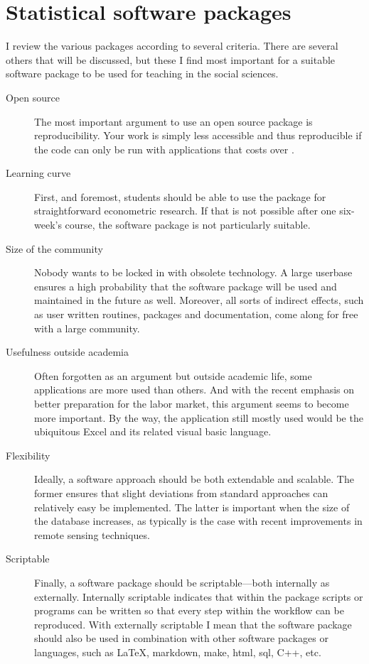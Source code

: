 \documentclass[fleqn,10pt]{SelfArx} %
\begin{document}
\section*{Statistical software packages}

I review the various packages according to several criteria. There are several
others that will be discussed, but these I find most important for a suitable
software package to be used for teaching in the social sciences. 
\begin{description}
\item[Open source] The most important argument to use an open source package is
  reproducibility. Your work is simply less accessible and thus reproducible if
  the code can only be run with applications that costs over . 
\item[Learning curve] First, and foremost, students should be able to use the
  package for straightforward econometric research. If that is not possible
  after one six-week's course, the software package is not particularly
  suitable. 
\item[Size of the community] Nobody wants to be locked in with obsolete
  technology. A large userbase ensures a high probability that the software
  package will be used and maintained in the future as well. Moreover, all sorts
  of indirect effects, such as user written routines, packages and
  documentation, come along for free with a large community. 
\item[Usefulness outside academia] Often forgotten as an argument but outside
  academic life, some applications are more used than others. And with the
  recent emphasis on better preparation for the labor market, this argument
  seems to become more important. By the way, the
  application still mostly used would be the ubiquitous Excel and its related
  visual basic language.
\item[Flexibility] Ideally, a software approach should be both extendable and scalable. The former ensures that slight deviations from standard approaches can relatively easy be implemented. The latter is important when the size of the database increases, as typically is the case with recent improvements in remote sensing techniques.
\item[Scriptable] Finally, a software package should be scriptable---both internally as externally. Internally scriptable indicates that within the package scripts or programs can be written so that every step within the workflow can be reproduced. With externally scriptable I mean that the software package should also be used in combination with other software packages or languages, such as \LaTeX, markdown, make, html, sql, C++, etc.
\end{description}
\end{document}
